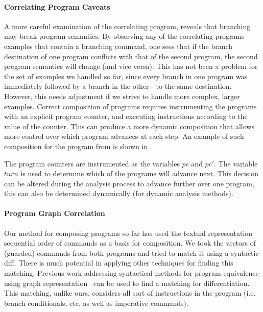 \paragraph{Correlating Program Caveats}
A more careful examination of the correlating program, reveals that branching may break program semantics. By observing any of the correlating programs examples that contain a branching  command, one sees that if the branch destination of one program conflicts with that of the second program, the second program semantics will change (and vice versa). This has not been a problem for the set of examples we handled so far, since every branch in one program was immediately followed by a branch in the other - to the same destination. However, this needs adjustment if we strive to handle more complex, larger examples. Correct composition of programs requires instrumenting the programs with an explicit program counter, and executing instructions according to the value of the counter. This can produce a more dynamic composition that allows more control over which program advances at each step. An example of such composition for the program from  is shown in .


The program counters are instrumented as the variables $pc$ and $pc'$. The variable $turn$ is used to determine which of the programs will advance next. This decision can be altered during the analysis process to advance further over one program, this can also be determined dynamically (for dynamic analysis methods).

\paragraph{Program Graph Correlation}
Our method for composing programs so far has used the textual representation sequential order of commands as a basis for composition. We took the vectors of (guarded) commands from both programs and tried to match it using a syntactic diff. There is much potential in applying other techniques for finding this matching. Previous work addressing syntactical methods for program equivalence using graph representation~\cite{Horwitz89,Horwitz90} can be used to find a matching for differentiation. This matching, unlike ours, considers all sort of instructions in the program (i.e. branch conditionals, etc. as well as imperative commands).

